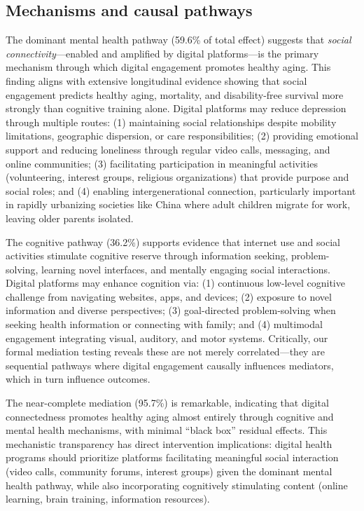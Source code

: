 \documentclass[10pt]{article}
\begin{document}
\subsection*{Mechanisms and causal pathways}

The dominant mental health pathway (59.6\% of total effect) suggests that \textit{social connectivity}---enabled and amplified by digital platforms---is the primary mechanism through which digital engagement promotes healthy aging. This finding aligns with extensive longitudinal evidence showing that social engagement predicts healthy aging, mortality, and disability-free survival more strongly than cognitive training alone. Digital platforms may reduce depression through multiple routes: (1) maintaining social relationships despite mobility limitations, geographic dispersion, or care responsibilities; (2) providing emotional support and reducing loneliness through regular video calls, messaging, and online communities; (3) facilitating participation in meaningful activities (volunteering, interest groups, religious organizations) that provide purpose and social roles; and (4) enabling intergenerational connection, particularly important in rapidly urbanizing societies like China where adult children migrate for work, leaving older parents isolated.

The cognitive pathway (36.2\%) supports evidence that internet use and social activities stimulate cognitive reserve through information seeking, problem-solving, learning novel interfaces, and mentally engaging social interactions. Digital platforms may enhance cognition via: (1) continuous low-level cognitive challenge from navigating websites, apps, and devices; (2) exposure to novel information and diverse perspectives; (3) goal-directed problem-solving when seeking health information or connecting with family; and (4) multimodal engagement integrating visual, auditory, and motor systems. Critically, our formal mediation testing reveals these are not merely correlated---they are sequential pathways where digital engagement causally influences mediators, which in turn influence outcomes.

The near-complete mediation (95.7\%) is remarkable, indicating that digital connectedness promotes healthy aging almost entirely through cognitive and mental health mechanisms, with minimal ``black box'' residual effects. This mechanistic transparency has direct intervention implications: digital health programs should prioritize platforms facilitating meaningful social interaction (video calls, community forums, interest groups) given the dominant mental health pathway, while also incorporating cognitively stimulating content (online learning, brain training, information resources).
\end{document}

